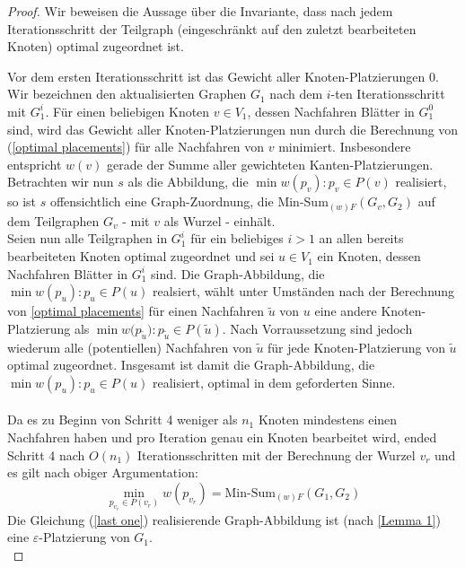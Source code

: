 \documentclass[a4paper, 12pt, twoside]{article}
\theoremstyle{Format1} %
\begin{document}
\begin{proof}
Wir beweisen die Aussage über die Invariante, dass nach jedem Iterationsschritt der Teilgraph (eingeschränkt auf
den zuletzt bearbeiteten Knoten) optimal zugeordnet ist.

Vor dem ersten Iterationsschritt ist das Gewicht aller Knoten-Platzierungen $0$.
Wir bezeichnen den aktualisierten Graphen $G_1$ nach dem $i$-ten Iterationsschritt mit $G_1^i$.
Für einen beliebigen Knoten $v \in V_1$, dessen Nachfahren Blätter in $G_1^0$ sind, wird das Gewicht aller Knoten-Platzierungen nun durch die Berechnung von (\ref{optimal placements})
für alle Nachfahren von $v$ minimiert. Insbesondere entspricht $w(v)$ gerade der Summe aller gewichteten Kanten-Platzierungen. Betrachten wir nun $s$ als die Abbildung, die $\min{w(p_v)}: p_v \in P(v)$ realisiert,
so ist $s$ offensichtlich eine Graph-Zuordnung, die Min-Sum$_{(w)F}(G_v, G_2)$ auf dem Teilgraphen $G_v$ - mit $v$ als Wurzel - einhält.
\\
Seien nun alle Teilgraphen in $G_1^i$ für ein beliebiges $i>1$ an allen bereits bearbeiteten Knoten optimal zugeordnet und sei $u \in V_1$ ein Knoten, dessen
Nachfahren Blätter in $G_1^i$ sind. Die Graph-Abbildung, die $\min{w(p_u)}: p_u \in P(u)$ realsiert, wählt unter Umständen nach der Berechnung von \ref{optimal placements}
für einen Nachfahren $\tilde{u}$ von $u$ eine andere Knoten-Platzierung als $\min{w(p_{\tilde{u}}}): p_{\tilde{u}} \in P(\tilde{u})$. Nach Vorraussetzung sind jedoch
wiederum alle (potentiellen) Nachfahren von $\tilde{u}$ für jede Knoten-Platzierung von $\tilde{u}$ optimal zugeordnet. Insgesamt ist damit die Graph-Abbildung, die $\min{w(p_u)}: p_u \in P(u)$ realisiert,
optimal in dem geforderten Sinne.
\\
\\
Da es zu Beginn von Schritt 4 weniger als $n_1$ Knoten mindestens einen Nachfahren haben und pro Iteration genau ein Knoten bearbeitet wird,
ended Schritt 4 nach $O(n_1)$ Iterationsschritten mit der Berechnung der Wurzel $v_r$ und es gilt nach obiger Argumentation:
\begin{equation}
	\min_{p_{v_r} \in P(v_r)}{w(p_{v_r})} = \text{Min-Sum}_{(w)F}(G_1,G_2) \label {last one}
\end{equation}
Die Gleichung (\ref{last one}) realisierende Graph-Abbildung ist (nach \ref{Lemma 1}) eine $\varepsilon$-Platzierung von $G_1$.
\\
\end{proof}
\end{document}
